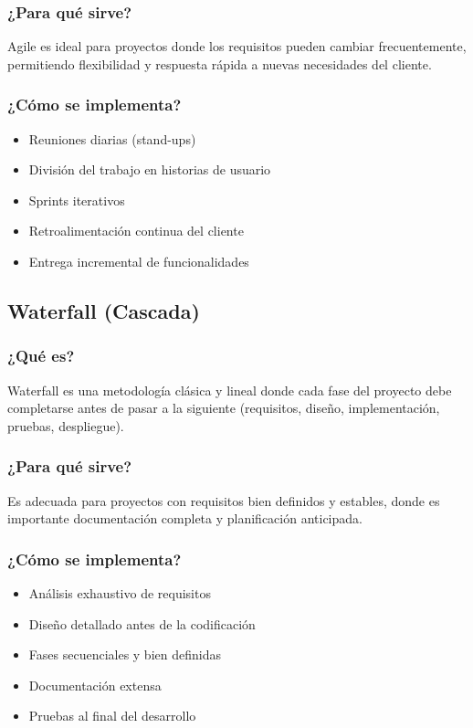 \documentclass[12pt, a4paper]{article}
\begin{document}
\subsubsection{¿Para qué sirve?}
Agile es ideal para proyectos donde los requisitos pueden cambiar frecuentemente, permitiendo flexibilidad y respuesta rápida a nuevas necesidades del cliente.

\subsubsection{¿Cómo se implementa?}
\begin{itemize}
    \item Reuniones diarias (stand-ups)
    \item División del trabajo en historias de usuario
    \item Sprints iterativos
    \item Retroalimentación continua del cliente
    \item Entrega incremental de funcionalidades
\end{itemize}

\subsection{Waterfall (Cascada)}

\subsubsection{¿Qué es?}
Waterfall es una metodología clásica y lineal donde cada fase del proyecto debe completarse antes de pasar a la siguiente (requisitos, diseño, implementación, pruebas, despliegue).

\subsubsection{¿Para qué sirve?}
Es adecuada para proyectos con requisitos bien definidos y estables, donde es importante documentación completa y planificación anticipada.

\subsubsection{¿Cómo se implementa?}
\begin{itemize}
    \item Análisis exhaustivo de requisitos
    \item Diseño detallado antes de la codificación
    \item Fases secuenciales y bien definidas
    \item Documentación extensa
    \item Pruebas al final del desarrollo
\end{itemize}
\end{document}
